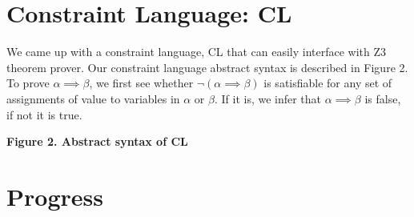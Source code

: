 \documentclass[9pt]{article}
\begin{document}
\section{Constraint Language: CL}
We came up with a constraint language, CL that can easily interface with Z3 theorem prover. Our constraint language abstract syntax is described in Figure 2. To prove $\alpha \implies \beta$, we first see whether $\neg(\alpha \implies \beta)$ is satisfiable for any set of assignments of value to variables in $\alpha$ or $\beta$. If it is, we infer that $\alpha \implies \beta$ is false, if not it is true.
\begin{center}\textbf{Figure 2. Abstract syntax of CL}\end{center}
\section{Progress}


{}

\end{document}
